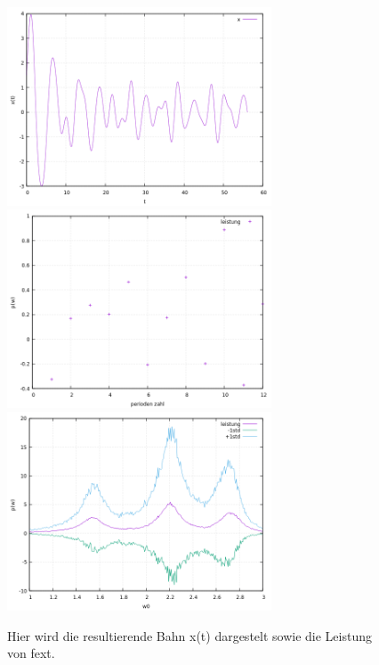 \documentclass[ngerman]{scrartcl}
\begin{document}
\begin{figure}[htbp]
	\centering
	\includegraphics[width=0.7\textwidth]{fext_x}
	\includegraphics[width=0.7\textwidth]{fext_leistung}
	\includegraphics[width=0.7\textwidth]{fext_scan}
	\caption[$f{ext}$]{Hier wird die resultierende Bahn x(t) dargestelt sowie die Leistung von fext.}
	\label{fig:euler}
\end{figure}
\end{document}
